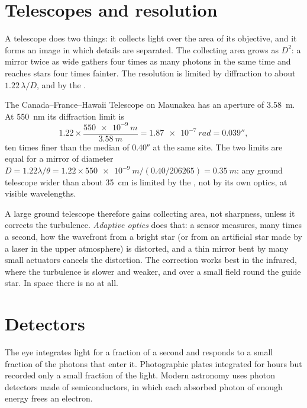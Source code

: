 \section{Telescopes and resolution}

A telescope does two things: it collects light over the area of its
objective, and it forms an image in which details are separated. The
collecting area grows as $D^2$: a mirror twice as wide gathers four times as
many photons in the same time and reaches stars four times fainter. The
resolution is limited by diffraction to about $1.22\,\lambda/D$, and by the
.

\begin{example}
The Canada--France--Hawaii Telescope on Maunakea has an aperture of
\qty{3.58}{m}. At \qty{550}{nm} its diffraction limit is
\[
  1.22\times\frac{\qty{550e-9}{m}}{\qty{3.58}{m}} = \qty{1.87e-7}{rad}
  = \ang{;;0.039},
\]
ten times finer than the median  of \ang{;;0.40} at the same site. The
two limits are equal for a mirror of diameter $D = 1.22\lambda/\theta =
1.22\times\qty{550e-9}{m}/(\num{0.40}/\num{206265}) = \qty{0.35}{m}$: any
ground telescope wider than about \qty{35}{cm} is limited by the , not
by its own optics, at visible wavelengths.
\end{example}

A large ground telescope therefore gains collecting area, not sharpness,
unless it corrects the turbulence. \emph{Adaptive optics} does that: a
sensor measures, many times a second, how the wavefront from a bright
star (or from an artificial star made by a laser in the upper atmosphere)
is distorted, and a thin mirror bent by many small actuators cancels the
distortion. The correction works best in the
infrared, where the turbulence is slower and weaker, and over a small field
round the guide star. In space there is no  at all.

\section{Detectors}

The eye integrates light for a fraction of a second and responds to a small
fraction of the photons that enter it. Photographic plates integrated for
hours but recorded only a small fraction of the light. Modern astronomy uses
photon detectors made of semiconductors, in which each absorbed photon of
enough energy frees an electron.

